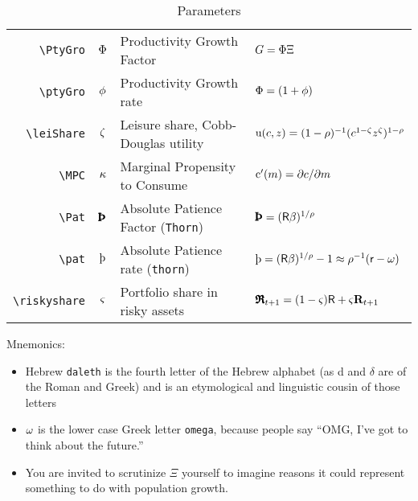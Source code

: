 \begin{table}[h]
\begin{tabular}{||>{\ttfamily}rcll||}
  \\ \verb|\PtyGro|  & $\Phi$ & Productivity Growth Factor & $G = \Phi \Xi$
  \\ \verb|\ptyGro|  & $\phi$ & Productivity Growth rate & $\Phi = (1+\phi)$
  \\ \verb|\leiShare|  & $\zeta$ & Leisure share, Cobb-Douglas utility & ${\mathrm{u}}(c,z)=(1-\rho)^{-1}(c^{1-\zeta}z^{\zeta})^{1-\rho}$
  \\ \verb|\MPC|  & $\kappa$ & Marginal Propensity to Consume & $\mathrm{c}^{\prime}(m)=\partial c/\partial m$
  \\ \verb|\Pat|  & $\Pat$ & Absolute Patience Factor (\texttt{Thorn}) & $\Pat = (\Rfree \DiscFac)^{1/\CRRA} $
  \\ \verb|\pat|  & $\pat$ & Absolute Patience rate (\texttt{thorn}) & $\pat = (\Rfree \DiscFac)^{1/\CRRA}-1 \approx \CRRA^{-1}(\rfree-\discRte) $
  \\ \verb|\riskyshare|  & $\varsigma$ & Portfolio share in risky assets & $\pmb{\mathfrak{R}}_{t+1}=(1-\varsigma)\mathsf{R}+\varsigma\mathbf{R}_{t+1}$
  \\	\hline
	\end{tabular}
	\caption{Parameters}
	\label{table:Parameters}
\end{table}

Mnemonics:
\begin{itemize}
\item Hebrew \texttt{daleth} is the fourth letter of the Hebrew alphabet (as d and $\delta$ are of the Roman and Greek) and is an etymological and linguistic cousin of those letters
\item $\omega$ is the lower case Greek letter \texttt{omega}, because people say ``OMG, I've got to think about the future.''
\item You are invited to scrutinize $\Xi$ yourself to imagine reasons it could represent something to do with population growth.
\end{itemize}


